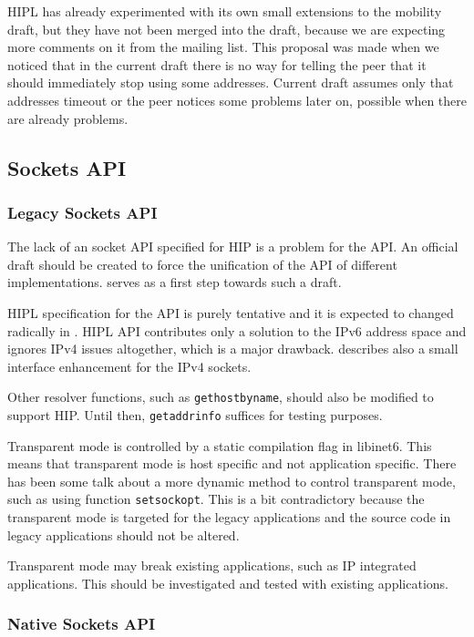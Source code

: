HIPL has already experimented with its own small extensions to the
mobility draft, but they have not been merged into the draft, because
we are expecting more comments on it from the mailing list. This
proposal was made when we noticed that in the current draft there is
no way for telling the peer that it should immediately stop using some
addresses. Current draft assumes only that addresses timeout or the
peer notices some problems later on, possible when there are already
problems.

\subsection{Sockets API}

\subsubsection{Legacy Sockets API}

The lack of an socket \ac{API} specified for \ac{HIP} is a problem for
the \ac{API}. An official draft should be created to force the
unification of the \ac{API} of different
implementations. \cite{hipapi} serves as a first step towards such a
draft.

\ac{HIPL} specification for the \ac{API}
 is purely tentative and it is expected
to changed radically in \cite{hipapi}. \ac{HIPL} \ac{API} contributes
only a solution to the IPv6 address space and ignores IPv4 issues
altogether, which is a major drawback. \cite{boeing} describes also a
small interface enhancement for the IPv4 sockets.

Other resolver functions, such as \verb|gethostbyname|, should also be
modified to support \ac{HIP}. Until then, \verb|getaddrinfo| suffices
for testing purposes.

Transparent mode is controlled by a static compilation flag in
libinet6. This means that transparent mode is host specific and not
application specific. There has been some talk about a more dynamic
method to control transparent mode, such as using function
\verb|setsockopt|. This is a bit contradictory because the transparent
mode is targeted for the legacy applications and the source code in
legacy applications should not be altered.

Transparent mode may break existing applications, such as IP
integrated applications. This should be investigated and tested with
existing applications.

\subsubsection{Native Sockets API}

